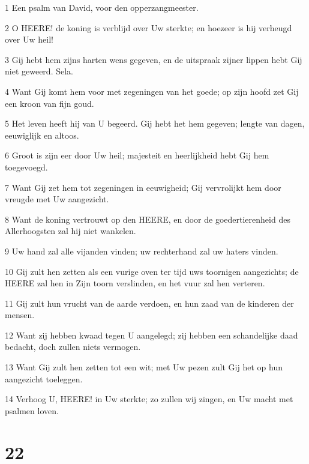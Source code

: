 \par 1 Een psalm van David, voor den opperzangmeester.
\par 2 O HEERE! de koning is verblijd over Uw sterkte; en hoezeer is hij verheugd over Uw heil!
\par 3 Gij hebt hem zijns harten wens gegeven, en de uitspraak zijner lippen hebt Gij niet geweerd. Sela.
\par 4 Want Gij komt hem voor met zegeningen van het goede; op zijn hoofd zet Gij een kroon van fijn goud.
\par 5 Het leven heeft hij van U begeerd. Gij hebt het hem gegeven; lengte van dagen, eeuwiglijk en altoos.
\par 6 Groot is zijn eer door Uw heil; majesteit en heerlijkheid hebt Gij hem toegevoegd.
\par 7 Want Gij zet hem tot zegeningen in eeuwigheid; Gij vervrolijkt hem door vreugde met Uw aangezicht.
\par 8 Want de koning vertrouwt op den HEERE, en door de goedertierenheid des Allerhoogsten zal hij niet wankelen.
\par 9 Uw hand zal alle vijanden vinden; uw rechterhand zal uw haters vinden.
\par 10 Gij zult hen zetten als een vurige oven ter tijd uws toornigen aangezichts; de HEERE zal hen in Zijn toorn verslinden, en het vuur zal hen verteren.
\par 11 Gij zult hun vrucht van de aarde verdoen, en hun zaad van de kinderen der mensen.
\par 12 Want zij hebben kwaad tegen U aangelegd; zij hebben een schandelijke daad bedacht, doch zullen niets vermogen.
\par 13 Want Gij zult hen zetten tot een wit; met Uw pezen zult Gij het op hun aangezicht toeleggen.
\par 14 Verhoog U, HEERE! in Uw sterkte; zo zullen wij zingen, en Uw macht met psalmen loven.

\chapter{22}


